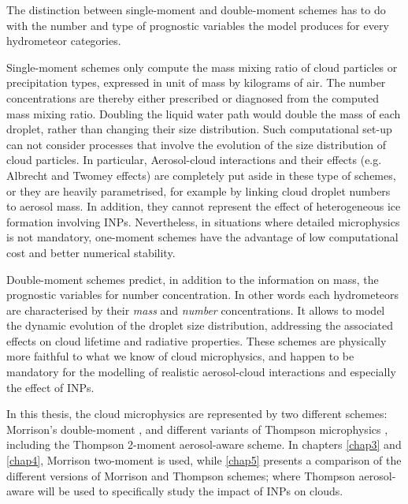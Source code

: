     The distinction between single-moment and double-moment schemes has to do with the number and type of prognostic variables the model produces for every hydrometeor categories.

    Single-moment schemes only compute the mass mixing ratio of cloud particles or precipitation types, expressed in unit of mass by kilograms of air. 
    The number concentrations are thereby either prescribed or diagnosed from the computed mass mixing ratio. Doubling the liquid water path would double the mass of each droplet, rather than changing their size distribution.
    Such computational set-up can not consider processes that involve the evolution of the size distribution of cloud particles. In particular, 
    Aerosol-cloud interactions and their effects (e.g. Albrecht and Twomey effects) are completely put aside in these type of schemes, or they are heavily parametrised, for example by linking cloud droplet numbers to aerosol mass. In addition, they cannot represent the effect of heterogeneous ice formation involving INPs.
    Nevertheless, in situations where detailed microphysics is not mandatory, one-moment schemes have the advantage of low computational cost and better numerical stability.

    Double-moment schemes predict, in addition to the information on mass, the prognostic variables for number concentration. In other words each hydrometeors are characterised by their \textit{mass} and \textit{number} concentrations.
    It allows to model the dynamic evolution of the droplet size distribution, addressing the associated effects on cloud lifetime and radiative properties. 
    These schemes are physically more faithful to what we know of cloud microphysics, and happen to be mandatory for the modelling of realistic aerosol-cloud interactions and especially the effect of INPs.
    \vspace{\baselineskip}

    In this thesis, the cloud microphysics are represented by two different schemes: Morrison's double-moment \citep{morrison_impact_2009}, and different variants of Thompson microphysics  \citep{thompson_explicit_2004}, including the Thompson 2-moment aerosol-aware \citep{thompson_study_2014} scheme. %
    In chapters \ref{chap3} and \ref{chap4}, Morrison two-moment is used, while \cref{chap5} presents a comparison of the different versions of Morrison and Thompson schemes; where Thompson aerosol-aware will be used to specifically study the impact of INPs on clouds.


